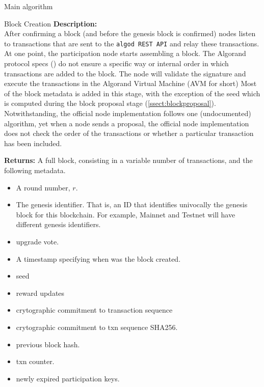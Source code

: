 \documentclass[10pt,a4paper]{article}
\begin{document}
\begin{section}{Main algorithm}
\begin{subsection}{Block Creation}
\noindent \textbf{Description:}\\
After confirming a block (and before the genesis block is confirmed) nodes listen to 
transactions that are sent to the {\tt algod REST API} and relay these transactions. 
At one point, the participation node starts assembling a block.
The Algorand protocol specs (\cite{DBLP:conf/sosp/GiladHMVZ17}) do not ensure 
a specific way or internal order in which transactions are added to the block.
The node will validate the signature and execute the transactions in the Algorand
Virtual Machine (AVM for short) 
Most of the block metadata is added in this stage, with the exception of the seed
which is computed during the block proposal stage (\ref{ssect:blockproposal}).
Notwithstanding, the official node implementation follows one (undocumented)
algorithm, yet when a node sends a proposal, the official node implementation
does not check the order of the transactions or whether a particular transaction
has been included.

\medskip
\noindent \textbf{Returns:} \newline
A full block, consisting in a variable number of transactions, 
and the following metadata.
\begin{itemize}
    \item A round number, $r$.
    \item The genesis identifier. That is, an ID that identifies univocally the 
        genesis block for this blockchain. For example, Mainnet and Testnet will
        have different genesis identifiers.
    \item upgrade vote.
    \item A timestamp specifying when was the block created.
    \item seed
    \item reward updates
    \item crytographic commitment to transaction sequence
    \item crytographic commitment to txn sequence SHA256.
    \item previous block hash.
    \item txn counter.
    \item newly expired participation keys.
  \end{itemize}


\end{subsection}
\end{section}
\end{document}
